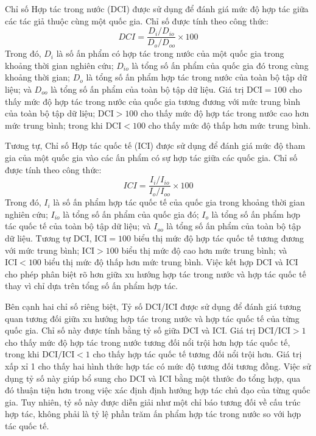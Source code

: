 Chỉ số Hợp tác trong nước (DCI) được sử dụng để đánh giá mức độ hợp tác giữa các tác giả thuộc cùng một quốc gia. Chỉ số được tính theo công thức:
\begin{equation}
DCI = \frac{D_i / D_{io}}{D_o / D_{oo}} \times 100
\end{equation}
Trong đó, $D_i$ là số ấn phẩm có hợp tác trong nước của một quốc gia trong khoảng thời gian nghiên cứu; $D_{io}$ là tổng số ấn phẩm của quốc gia đó trong cùng khoảng thời gian; $D_o$ là tổng số ấn phẩm hợp tác trong nước của toàn bộ tập dữ liệu; và $D_{oo}$ là tổng số ấn phẩm của toàn bộ tập dữ liệu. Giá trị $\text{DCI} = 100$ cho thấy mức độ hợp tác trong nước của quốc gia tương đương với mức trung bình của toàn bộ tập dữ liệu; $\text{DCI} > 100$ cho thấy mức độ hợp tác trong nước cao hơn mức trung bình; trong khi $\text{DCI} < 100$ cho thấy mức độ thấp hơn mức trung bình.

Tương tự, Chỉ số Hợp tác quốc tế (ICI) được sử dụng để đánh giá mức độ tham gia của một quốc gia vào các ấn phẩm có sự hợp tác giữa các quốc gia. Chỉ số được tính theo công thức:
\begin{equation}
ICI = \frac{I_i / I_{io}}{I_o / I_{oo}} \times 100
\end{equation}
Trong đó, $I_i$ là số ấn phẩm hợp tác quốc tế của quốc gia trong khoảng thời gian nghiên cứu; $I_{io}$ là tổng số ấn phẩm của quốc gia đó; $I_o$ là tổng số ấn phẩm hợp tác quốc tế của toàn bộ tập dữ liệu; và $I_{oo}$ là tổng số ấn phẩm của toàn bộ tập dữ liệu. Tương tự DCI, $\text{ICI} = 100$ biểu thị mức độ hợp tác quốc tế tương đương với mức trung bình; $\text{ICI} > 100$ biểu thị mức độ cao hơn mức trung bình; và $\text{ICI} < 100$ biểu thị mức độ thấp hơn mức trung bình. Việc kết hợp DCI và ICI cho phép phân biệt rõ hơn giữa xu hướng hợp tác trong nước và hợp tác quốc tế thay vì chỉ dựa trên tổng số ấn phẩm hợp tác.

Bên cạnh hai chỉ số riêng biệt, Tỷ số DCI/ICI được sử dụng để đánh giá tương quan tương đối giữa xu hướng hợp tác trong nước và hợp tác quốc tế của từng quốc gia. Chỉ số này được tính bằng tỷ số giữa DCI và ICI. Giá trị $\text{DCI/ICI} > 1$ cho thấy mức độ hợp tác trong nước tương đối nổi trội hơn hợp tác quốc tế, trong khi $\text{DCI/ICI} < 1$ cho thấy hợp tác quốc tế tương đối nổi trội hơn. Giá trị xấp xỉ 1 cho thấy hai hình thức hợp tác có mức độ tương đối tương đồng. Việc sử dụng tỷ số này giúp bổ sung cho DCI và ICI bằng một thước đo tổng hợp, qua đó thuận tiện hơn trong việc xác định định hướng hợp tác chủ đạo của từng quốc gia. Tuy nhiên, tỷ số này được diễn giải như một chỉ báo tương đối về cấu trúc hợp tác, không phải là tỷ lệ phần trăm ấn phẩm hợp tác trong nước so với hợp tác quốc tế.

